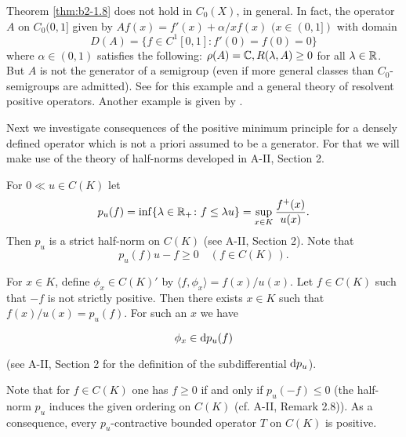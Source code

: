 \begin{remark*}\label{rem:b2-1.9-kgk2}
Theorem \ref{thm:b2-1.8} does not hold in $C_{0}(X)$, in general.
In fact, the operator $A$ on $C_{0}(0,1]$ given by $Af(x) = f'(x) + \alpha/x f(x)$ $(x \in (0,1])$ with domain 
\[
D(A) = \{f \in C^{1}[0,1] \colon f'(0) = f(0) = 0\} 
\]
where $\alpha \in (0,1)$  satisfies the following: 
$\rho(A) = \mathbb{C}, R(\lambda,A) \geq 0$ for all $\lambda \in \mathbb{R}$.
But $A$ is not the generator of a semigroup (even if more general classes than $C_{0}$-semigroups are admitted).
See \citet{arendt:1987} 
for this example and a general theory of resolvent positive operators.
Another example is given by \citet{battydavies:1983}.
\end{remark*}

Next we investigate consequences of the positive minimum principle for a densely defined operator which is not a priori assumed to be a generator.
For that we will make use of the theory of half-norms developed in A-II, Section 2.

For $0  \ll u \in C(K)$ let
\begin{equation}\label{eq:b2-1.4}
p_{u}(f) = \inf\{\lambda \in \mathbb{R}_{+} \colon f \leq \lambda u\} = \sup_{x \in K} \frac{f^{+}(x)}{u(x)}.
\end{equation}
Then $p_{u}$ is a strict half-norm on $C(K)$ (see A-II, Section  2).
Note that
\begin{equation}\label{eq:b2-1.5}
p_{u}(f)u - f \geq 0 \quad (f \in C(K)\,).
\end{equation}

For $x \in K$, define $\phi_{x} \in C(K)'$ by $\langle f,\phi_{x} \rangle = f(x)/u(x)$.
Let $f \in C(K)$ such that $-f$ is not strictly positive.
Then there exists $x \in K$ such that $f(x)/u(x) = p_{u}(f)$.
For such an $x$ we have

\begin{equation}\label{eq:b2-1.6}
\phi_{x} \in \mathop{}\!\mathrm{d}{p}_{u}(f)
\end{equation}


(see A-II, Section 2 for the definition of the subdifferential $\mathop{}\!\mathrm{d}{p}_{u}$).

Note that for $f \in C(K)$ one has $f \geq 0$ if and only if $p_{u}(-f) \leq 0$ (\ie  the half-norm $p_{u}$ induces the given ordering on $C(K)$ (cf. A-II, Remark 2.8)).
As a consequence, every $p_{u}$-contractive bounded operator $T$ on $C(K)$ is positive.

